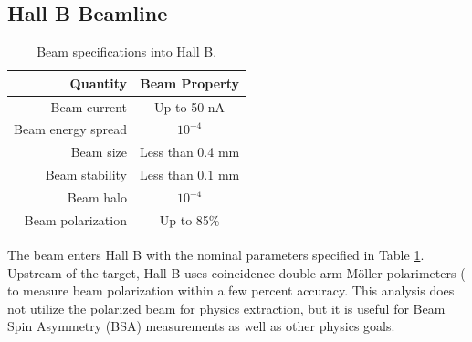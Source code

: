     \clearpage
    \subsection{Hall B Beamline}

        \begin{table}[h]
                \centering
                \begin{tabular}{rc}
                    Quantity  & Beam Property \\\hline
                    Beam current  & Up to 50 nA \\
                    Beam energy spread  & $10^{-4}$ \\
                    Beam size  & Less than 0.4 mm \\
                    Beam stability  & Less than 0.1 mm \\
                    Beam halo & $10^{-4}$ \\
                    Beam polarization & Up to 85\% \\
                \end{tabular}
            \caption{Beam specifications into Hall B.}
            \label{table:beam-properties}
        \end{table}
        
        The beam enters Hall B with the nominal parameters specified in Table \ref{table:beam-properties}. Upstream of the target, Hall B uses coincidence double arm M\"oller polarimeters ( to measure beam polarization within a few percent accuracy. This analysis does not utilize the polarized beam for physics extraction, but it is useful for Beam Spin Asymmetry (BSA) measurements as well as other physics goals. 
    
